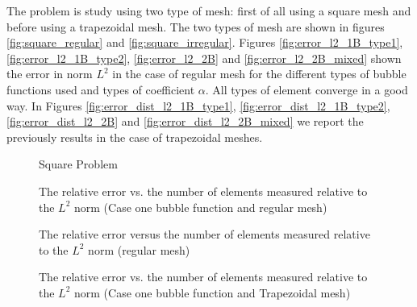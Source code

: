 \documentclass[preprint,12pt,authoryear]{elsarticle}
\begin{document}
The problem is study using two type of mesh: first of all using a square mesh and before using a trapezoidal mesh. The two types of mesh are shown in figures \ref{fig:square_regular} and \ref{fig:square_irregular}.
Figures \ref{fig:error_l2_1B_type1}, \ref{fig:error_l2_1B_type2}, \ref{fig:error_l2_2B} and \ref{fig:error_l2_2B_mixed} shown the error in norm $L^{2}$ in the case of regular mesh for the different types of bubble functions used and types of coefficient $\alpha$. All types of element converge in a good way.
In Figures  \ref{fig:error_dist_l2_1B_type1}, \ref{fig:error_dist_l2_1B_type2}, \ref{fig:error_dist_l2_2B} and \ref{fig:error_dist_l2_2B_mixed} we report the previously results in the case of trapezoidal meshes. 
%
\begin{figure}[h!]
\begin{center}
\hspace{5pt}
\caption{Square Problem}
\end{center}
\end{figure}
\begin{figure}[h!]
\begin{center}
\caption{The relative error vs. the number of elements measured relative 
to the $L^{2}$ norm (Case one bubble function and regular mesh)}
\end{center}
\end{figure}
%
\begin{figure}[h!]
\begin{center}
\caption{The relative error versus the number of elements measured relative to the $L^{2}$ norm (regular mesh)}
\end{center}
\end{figure}
\begin{figure}[h!]
\begin{center}
\caption{The relative error vs. the number of elements measured relative 
to the $L^{2}$ norm (Case one bubble function and Trapezoidal mesh)}
\end{center}
\end{figure}
\end{document}
